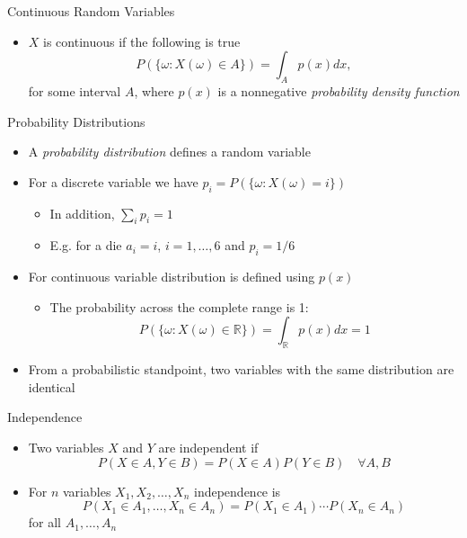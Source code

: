 \documentclass{beamer}
\begin{document}
\begin{frame}{Continuous Random Variables} 
\begin{itemize} 
 \item $X$ is continuous if the following is true 
\begin{displaymath} 
P(\{\omega: X(\omega) \in A\}) = \int_{A} p(x) dx, 
\end{displaymath}
for some interval $A$, where $p(x)$ is a nonnegative \emph{probability density function} 
\end{itemize}
\end{frame}

\begin{frame}{Probability Distributions} 
\begin{itemize}
\item A \emph{probability distribution} defines a random variable 
\item For a discrete variable we have $p_i = P(\{\omega: X(\omega) = i\})$
\begin{itemize}
\item In addition, $\sum_i p_i  = 1$
\item E.g. for a die $a_i = i$, $i=1,\ldots, 6$ and $p_i = 1/6$
\end{itemize}
\item For continuous variable distribution is defined using $p(x)$
\begin{itemize}
\item The probability across the complete range is 1: 
\begin{displaymath}
P(\{\omega: X(\omega) \in \mathbb{R}\}) = \int_\mathbb{R} p(x) dx = 1
\end{displaymath} 
\end{itemize}
\item From a probabilistic standpoint, two variables with the same distribution are identical 
\end{itemize}
\end{frame}

\begin{frame}{Independence}  
\begin{itemize} 
 \item Two variables $X$ and $Y$ are independent if 
 \begin{displaymath} 
  P(X \in A, Y \in B) = P(X \in A)P(Y \in B) \quad \forall A, B
 \end{displaymath}
\item For $n$ variables $X_1, X_2, \ldots, X_n$ independence is 
 \begin{displaymath} 
  P(X_1 \in A_1, \ldots, X_n \in A_n) = P(X_1 \in A_1) \cdots P(X_n \in A_n)
 \end{displaymath}
 for all $A_1, \ldots, A_n$ 
\end{itemize}
\end{frame}
\end{document}

